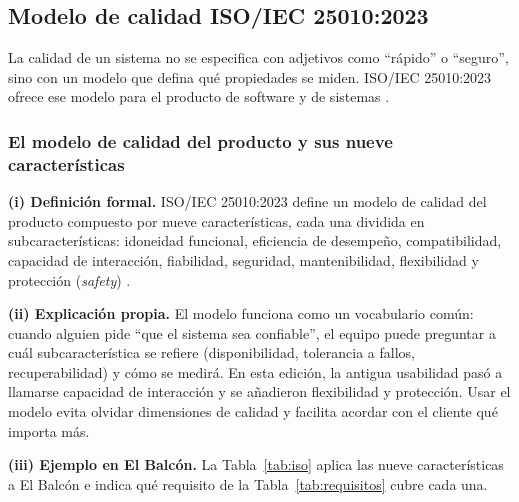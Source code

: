 \subsection{Modelo de calidad ISO/IEC 25010:2023}

La calidad de un sistema no se especifica con adjetivos como ``r\'apido'' o ``seguro'', sino con un modelo que defina qu\'e propiedades se miden. ISO/IEC 25010:2023 ofrece ese modelo para el producto de software y de sistemas \cite{iso25010}.

\subsubsection{El modelo de calidad del producto y sus nueve caracter\'isticas}
\textbf{(i) Definici\'on formal.} ISO/IEC 25010:2023 define un modelo de calidad del producto compuesto por nueve caracter\'isticas, cada una dividida en subcaracter\'isticas: idoneidad funcional, eficiencia de desempe\~no, compatibilidad, capacidad de interacci\'on, fiabilidad, seguridad, mantenibilidad, flexibilidad y protecci\'on (\emph{safety}) \cite{iso25010}.
\par
\textbf{(ii) Explicaci\'on propia.} El modelo funciona como un vocabulario com\'un: cuando alguien pide ``que el sistema sea confiable'', el equipo puede preguntar a cu\'al subcaracter\'istica se refiere (disponibilidad, tolerancia a fallos, recuperabilidad) y c\'omo se medir\'a. En esta edici\'on, la antigua usabilidad pas\'o a llamarse capacidad de interacci\'on y se a\~nadieron flexibilidad y protecci\'on. Usar el modelo evita olvidar dimensiones de calidad y facilita acordar con el cliente qu\'e importa m\'as.\par
\textbf{(iii) Ejemplo en El Balc\'on.} La Tabla~\ref{tab:iso} aplica las nueve caracter\'isticas a El Balc\'on e indica qu\'e requisito de la Tabla~\ref{tab:requisitos} cubre cada una.\par

